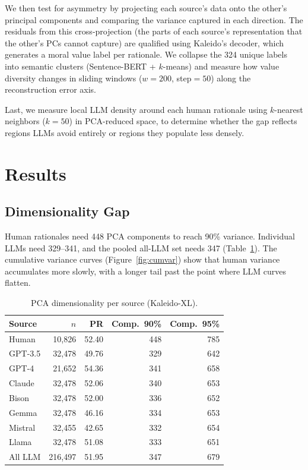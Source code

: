 \documentclass[11pt,a4paper]{article}
\begin{document}
We then test for asymmetry by projecting each source's data onto the other's principal components and comparing the variance captured in each direction. The residuals from this cross-projection (the parts of each source's representation that the other's PCs cannot capture) are qualified using Kaleido's decoder, which generates a moral value label per rationale. We collapse the 324 unique labels into semantic clusters (Sentence-BERT + $k$-means) and measure how value diversity changes in sliding windows ($w{=}200$, step${=}50$) along the reconstruction error axis.

Last, we measure local LLM density around each human rationale using $k$-nearest neighbors ($k{=}50$) in PCA-reduced space, to determine whether the gap reflects regions LLMs avoid entirely or regions they populate less densely.

\section{Results}

\subsection{Dimensionality Gap}

Human rationales need 448 PCA components to reach 90\% variance. Individual LLMs need 329--341, and the pooled all-LLM set needs 347 (Table~\ref{tab:summary}). The cumulative variance curves (Figure~\ref{fig:cumvar}) show that human variance accumulates more slowly, with a longer tail past the point where LLM curves flatten.

\begin{table}[H]
\centering\small
\caption{PCA dimensionality per source (Kaleido-XL).}
\label{tab:summary}
\vspace{-0.5em}
\begin{tabular}{lrrrr}
\toprule
Source & $n$ & PR & Comp.\ 90\% & Comp.\ 95\% \\
\midrule
Human   & 10,826  & 52.40 & 448 & 785 \\
GPT-3.5 & 32,478  & 49.76 & 329 & 642 \\
GPT-4   & 21,652  & 54.36 & 341 & 658 \\
Claude  & 32,478  & 52.06 & 340 & 653 \\
Bison   & 32,478  & 52.00 & 336 & 652 \\
Gemma   & 32,478  & 46.16 & 334 & 653 \\
Mistral & 32,455  & 42.65 & 332 & 654 \\
Llama   & 32,478  & 51.08 & 333 & 651 \\
All LLM & 216,497 & 51.95 & 347 & 679 \\
\bottomrule
\end{tabular}
\end{table}
\end{document}

